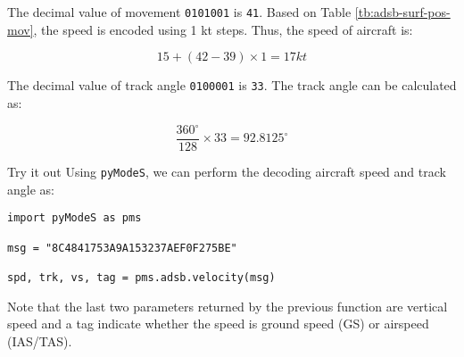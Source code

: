 The decimal value of movement \texttt{0101001} is \texttt{41}. Based on Table \ref{tb:adsb-surf-pos-mov}, the speed is encoded using 1 kt steps. Thus, the speed of aircraft is:

\begin{equation}
  15 + (42 - 39) \times 1 = 17 kt
\end{equation}

The decimal value of track angle \texttt{0100001} is \texttt{33}. The track angle can be calculated as:

\begin{equation}
  \frac{360^\circ}{128} \times 33 = 92.8125 ^\circ
\end{equation}

\begin{notebox}{Try it out}
Using \texttt{pyModeS}, we can perform the decoding aircraft speed and track angle as: 

\begin{verbatim}
import pyModeS as pms

msg = "8C4841753A9A153237AEF0F275BE"

spd, trk, vs, tag = pms.adsb.velocity(msg)
\end{verbatim}

Note that the last two parameters returned by the previous function are vertical speed and a tag indicate whether the speed is ground speed (GS) or airspeed (IAS/TAS).

\end{notebox}
